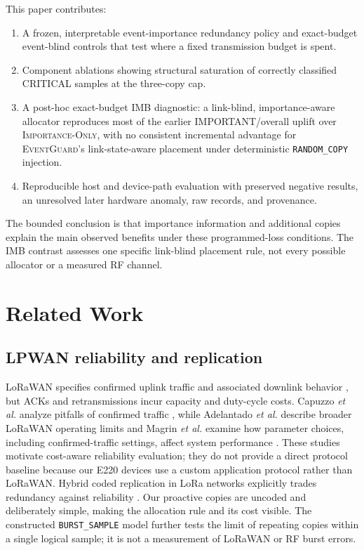 \documentclass[11pt]{article}
\newcommand{\EG}{\textsc{EventGuard}}
\newcommand{\IO}{\textsc{Importance-Only}}
\begin{document}
This paper contributes:
\begin{enumerate}
\item A frozen, interpretable event-importance redundancy policy and exact-budget event-blind controls that test where a fixed transmission budget is spent.
\item Component ablations showing structural saturation of correctly classified CRITICAL samples at the three-copy cap.
\item A post-hoc exact-budget IMB diagnostic: a link-blind, importance-aware allocator reproduces most of the earlier IMPORTANT/overall uplift over \IO{}, with no consistent incremental advantage for \EG{}'s link-state-aware placement under deterministic \texttt{RANDOM\_COPY} injection.
\item Reproducible host and device-path evaluation with preserved negative results, an unresolved later hardware anomaly, raw records, and provenance.
\end{enumerate}

The bounded conclusion is that importance information and additional copies explain the main observed benefits under these programmed-loss conditions. The IMB contrast assesses one specific link-blind placement rule, not every possible allocator or a measured RF channel.

\section{Related Work}\label{sec:related-work}

\subsection{LPWAN reliability and replication}\label{sec:lpwan-reliability-and-replication}

LoRaWAN specifies confirmed uplink traffic and associated downlink behavior \cite{lorawan104}, but ACKs and retransmissions incur capacity and duty-cycle costs. Capuzzo \emph{et al.} analyze pitfalls of confirmed traffic \cite{capuzzo2018confirmed}, while Adelantado \emph{et al.} describe broader LoRaWAN operating limits \cite{adelantado2017limits} and Magrin \emph{et al.} examine how parameter choices, including confirmed-traffic settings, affect system performance \cite{magrin2020lorawan}. These studies motivate cost-aware reliability evaluation; they do not provide a direct protocol baseline because our E220 devices use a custom application protocol rather than LoRaWAN. Hybrid coded replication in LoRa networks explicitly trades redundancy against reliability \cite{santana2020hybrid}. Our proactive copies are uncoded and deliberately simple, making the allocation rule and its cost visible. The constructed \texttt{BURST\_SAMPLE} model further tests the limit of repeating copies within a single logical sample; it is not a measurement of LoRaWAN or RF burst errors.
\end{document}
